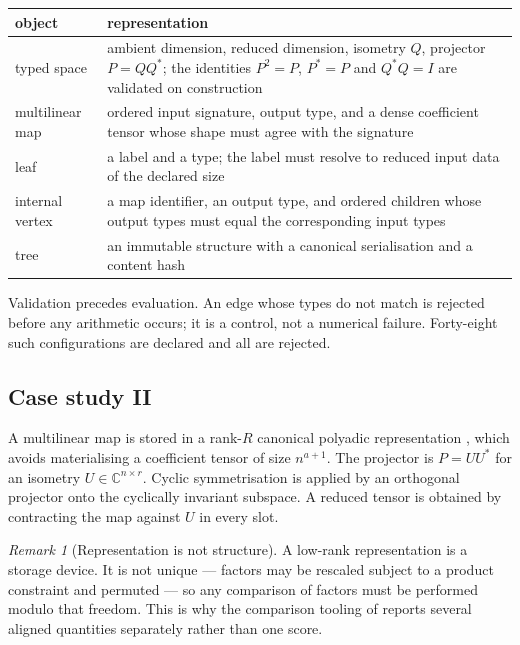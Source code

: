 \documentclass[11pt]{amsart}
\theoremstyle{remark}
\newtheorem{remark}{Remark}[section]
\begin{document}
\begin{center}
\small
\begin{tabularx}{\linewidth}{@{}lX@{}}
\toprule
object & representation \\
\midrule
typed space & ambient dimension, reduced dimension, isometry $Q$, projector $P=QQ^{*}$; the identities $P^{2}=P$, $P^{*}=P$ and $Q^{*}Q=I$ are validated on construction \\
multilinear map & ordered input signature, output type, and a dense coefficient tensor whose shape must agree with the signature \\
leaf & a label and a type; the label must resolve to reduced input data of the declared size \\
internal vertex & a map identifier, an output type, and ordered children whose output types must equal the corresponding input types \\
tree & an immutable structure with a canonical serialisation and a content hash \\
\bottomrule
\end{tabularx}
\end{center}

Validation precedes evaluation. An edge whose types do not match is rejected before any
arithmetic occurs; it is a control, not a numerical failure. Forty-eight such
configurations are declared and all are rejected.

\subsection{Case study II}

A multilinear map is stored in a rank-$R$ canonical polyadic representation
\cite{KoldaBader2009}, which avoids materialising a coefficient tensor of size
$n^{a+1}$. The projector is $P=UU^{*}$ for an isometry $U\in\mathbb C^{n\times r}$. Cyclic
symmetrisation is applied by an orthogonal projector onto the cyclically invariant subspace.
A reduced tensor is obtained by contracting the map against $U$ in every slot.

\begin{remark}[Representation is not structure]
\label{rem:representation}
A low-rank representation is a storage device. It is not unique --- factors may be rescaled
subject to a product constraint and permuted --- so any comparison of factors must be
performed modulo that freedom. This is why the comparison tooling of
\cite{ChaveroJassoNumerical} reports several aligned quantities separately rather than one
score.
\end{remark}
\end{document}
